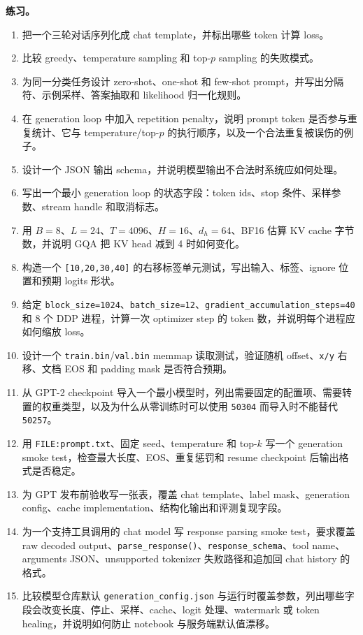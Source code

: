\documentclass[UTF8,zihao=-4,openany]{ctexbook}
\begin{document}
\textbf{练习。}
\begin{enumerate}
\item 把一个三轮对话序列化成 chat template，并标出哪些 token 计算 loss。
\item 比较 greedy、temperature sampling 和 top-$p$ sampling 的失败模式。
\item 为同一分类任务设计 zero-shot、one-shot 和 few-shot prompt，并写出分隔符、示例采样、答案抽取和 likelihood 归一化规则。
\item 在 generation loop 中加入 repetition penalty，说明 prompt token 是否参与重复统计、它与 temperature/top-$p$ 的执行顺序，以及一个合法重复被误伤的例子。
\item 设计一个 JSON 输出 schema，并说明模型输出不合法时系统应如何处理。
\item 写出一个最小 generation loop 的状态字段：token ids、stop 条件、采样参数、stream handle 和取消标志。
\item 用 $B=8$、$L=24$、$T=4096$、$H=16$、$d_h=64$、BF16 估算 KV cache 字节数，并说明 GQA 把 KV head 减到 4 时如何变化。
\item 构造一个 \texttt{[10,20,30,40]} 的右移标签单元测试，写出输入、标签、ignore 位置和预期 logits 形状。
\item 给定 \texttt{block\_size=1024}、\texttt{batch\_size=12}、\texttt{gradient\_accumulation\_steps=40} 和 8 个 DDP 进程，计算一次 optimizer step 的 token 数，并说明每个进程应如何缩放 loss。
\item 设计一个 \texttt{train.bin}/\texttt{val.bin} memmap 读取测试，验证随机 offset、\texttt{x/y} 右移、文档 EOS 和 padding mask 是否符合预期。
\item 从 GPT-2 checkpoint 导入一个最小模型时，列出需要固定的配置项、需要转置的权重类型，以及为什么从零训练时可以使用 \texttt{50304} 而导入时不能替代 \texttt{50257}。
\item 用 \texttt{FILE:prompt.txt}、固定 seed、temperature 和 top-$k$ 写一个 generation smoke test，检查最大长度、EOS、重复惩罚和 resume checkpoint 后输出格式是否稳定。
\item 为 GPT 发布前验收写一张表，覆盖 chat template、label mask、generation config、cache implementation、结构化输出和评测复现字段。
\item 为一个支持工具调用的 chat model 写 response parsing smoke test，要求覆盖 raw decoded output、\texttt{parse\_response()}、\texttt{response\_schema}、tool name、arguments JSON、unsupported tokenizer 失败路径和追加回 chat history 的格式。
\item 比较模型仓库默认 \texttt{generation\_config.json} 与运行时覆盖参数，列出哪些字段会改变长度、停止、采样、cache、logit 处理、watermark 或 token healing，并说明如何防止 notebook 与服务端默认值漂移。
\end{enumerate}
\end{document}
